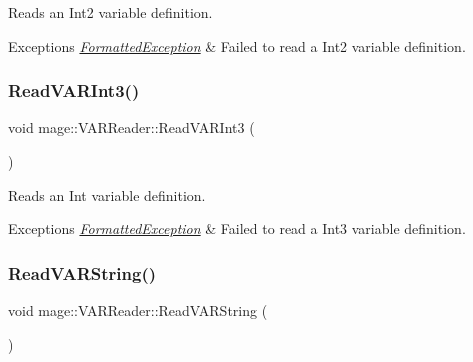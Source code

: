 Reads an Int2 variable definition.


\begin{DoxyExceptions}{Exceptions}
{\em \hyperlink{classmage_1_1_formatted_exception}{Formatted\+Exception}} & Failed to read a Int2 variable definition. \\
\hline
\end{DoxyExceptions}
\hypertarget{classmage_1_1_v_a_r_reader_a8a809be1eeebc2649e16524d8c65529f}{}\label{classmage_1_1_v_a_r_reader_a8a809be1eeebc2649e16524d8c65529f} 
\subsubsection{\texorpdfstring{Read\+V\+A\+R\+Int3()}{ReadVARInt3()}}
{\footnotesize\ttfamily void mage\+::\+V\+A\+R\+Reader\+::\+Read\+V\+A\+R\+Int3 (\begin{DoxyParamCaption}{ }\end{DoxyParamCaption})\hspace{0.3cm}{\ttfamily [private]}}

Reads an Int variable definition.


\begin{DoxyExceptions}{Exceptions}
{\em \hyperlink{classmage_1_1_formatted_exception}{Formatted\+Exception}} & Failed to read a Int3 variable definition. \\
\hline
\end{DoxyExceptions}
\hypertarget{classmage_1_1_v_a_r_reader_a52bb3a842c7887099a4dff875a3608a0}{}\label{classmage_1_1_v_a_r_reader_a52bb3a842c7887099a4dff875a3608a0} 
\subsubsection{\texorpdfstring{Read\+V\+A\+R\+String()}{ReadVARString()}}
{\footnotesize\ttfamily void mage\+::\+V\+A\+R\+Reader\+::\+Read\+V\+A\+R\+String (\begin{DoxyParamCaption}{ }\end{DoxyParamCaption})\hspace{0.3cm}{\ttfamily [private]}}

